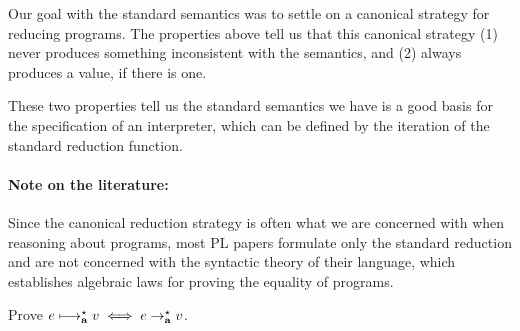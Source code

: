 Our goal with the standard semantics was to settle on a canonical
strategy for reducing programs.  The properties above tell us that
this canonical strategy (1) never produces something inconsistent with
the semantics, and (2) always produces a value, if there is one.

These two properties tell us the standard semantics we have is a good
basis for the specification of an interpreter, which can be defined by
the iteration of the standard reduction function.

\paragraph{Note on the literature:} Since the canonical reduction strategy
is often what we are concerned with when reasoning about programs,
most PL papers formulate only the standard reduction and are not
concerned with the syntactic theory of their language, which establishes
algebraic laws for proving the equality of programs.

\begin{exercise}
Prove $e\longmapsto^\star_{\mathop{\mathbf{a}}}v \iff e \rightarrow^\star_\mathbf{a} v$.
\end{exercise}


